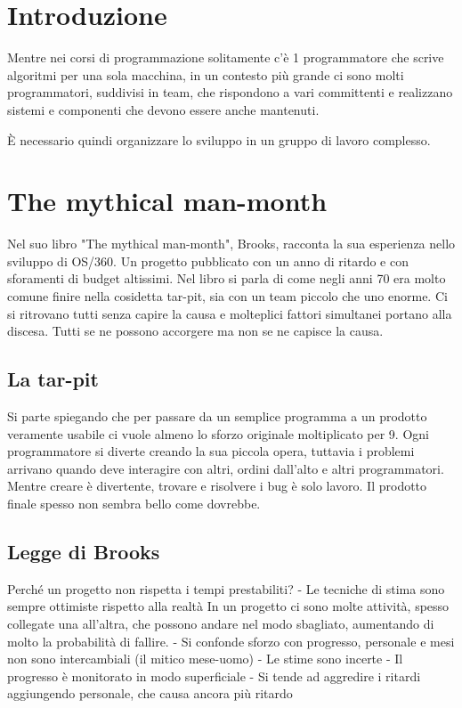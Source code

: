 \documentclass[a4paper,12pt,titlepage,oneside]{book}
\begin{document}
\section{Introduzione}
Mentre nei corsi di programmazione solitamente c'è 1 programmatore che scrive algoritmi per una sola macchina, in un contesto più grande ci sono molti programmatori, suddivisi in team, che rispondono a vari committenti e realizzano sistemi e componenti che devono essere anche mantenuti.

È necessario quindi organizzare lo sviluppo in un gruppo di lavoro complesso.

\section{The mythical man-month}
Nel suo libro "The mythical man-month", Brooks, racconta la sua esperienza nello sviluppo di OS/360. Un progetto pubblicato con un anno di ritardo e con sforamenti di budget altissimi.
Nel libro si parla di come negli anni 70 era molto comune finire nella cosidetta tar-pit, sia con un team piccolo che uno enorme. Ci si ritrovano tutti senza capire la causa e molteplici fattori simultanei portano alla discesa. Tutti se ne possono accorgere ma non se ne capisce la causa.

\subsection{La tar-pit}
Si parte spiegando che per passare da un semplice programma a un prodotto veramente usabile ci vuole almeno lo sforzo originale moltiplicato per 9.
Ogni programmatore si diverte creando la sua piccola opera, tuttavia i problemi arrivano quando deve interagire con altri, ordini dall'alto e altri programmatori. Mentre creare è divertente, trovare e risolvere i bug è solo lavoro. Il prodotto finale spesso non sembra bello come dovrebbe.

\subsection{Legge di Brooks}
Perché un progetto non rispetta i tempi prestabiliti?
- Le tecniche di stima sono sempre ottimiste rispetto alla realtà
    In un progetto ci sono molte attività, spesso collegate una all'altra, che possono andare nel modo sbagliato, aumentando di molto la probabilità di fallire.
- Si confonde sforzo con progresso, personale e mesi non sono intercambiali (il mitico mese-uomo)
- Le stime sono incerte
- Il progresso è monitorato in modo superficiale
- Si tende ad aggredire i ritardi aggiungendo personale, che causa ancora più ritardo
\end{document}
